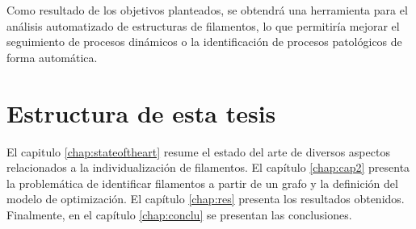 \begin{intro}

Como resultado de los objetivos planteados, se obtendr\'a una herramienta para el an\'alisis automatizado de estructuras de filamentos, lo que permitir\'ia mejorar el seguimiento de procesos din\'amicos o la identificaci\'on de procesos patol\'ogicos de forma autom\'atica.

\section*{Estructura de esta tesis}
El capitulo \ref{chap:stateoftheart} resume el estado del arte de diversos aspectos relacionados a la individualizaci\'on de filamentos. El cap\'itulo \ref{chap:cap2} presenta la problem\'atica de identificar filamentos a partir de un grafo y la definici\'on del modelo de optimizaci\'on. El cap\'itulo \ref{chap:res} presenta los resultados obtenidos. Finalmente, en el cap\'itulo \ref{chap:conclu} se presentan las conclusiones.

\end{intro}